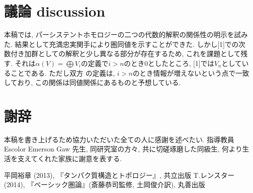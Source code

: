 \documentclass[a4paper]{jsarticle}
\theoremstyle{definition}
\begin{document}
\section{議論 discussion}
本稿では, パーシステントホモロジーの二つの代数的解釈の関係性の明示を試みた. 結果として充満忠実関手により圏同値を示すことができた. しかし[1]での次数付き加群としての解釈と少し異なる部分が存在するため, これを課題として残す. それは$\alpha(V)=\bigoplus V_i$の定義で$i>n$のとき0としたところ, [1]では$V_n$としていることである. ただし双方
の定義は, $i>n$のとき情報が増えないという点で一致しており, この関係は同値関係にあるものと予想している.

\section*{謝辞}
本稿を書き上げるため協力いただいた全ての人に感謝を述べたい. 指導教員 Escolor Emerson Gaw 先生, 同研究室の方々, 共に切磋琢磨した同級生, 何より生活を支えてくれた家族に謝意を表する.


\begin{thebibliography}{9}
     平岡裕章 (2013), 『タンパク質構造とトポロジー』, 共立出版
     T.レンスター (2014), 『ベーシック圏論』(斎藤恭司監修, 土岡俊介訳), 丸善出版
\end{thebibliography}
\end{document}
